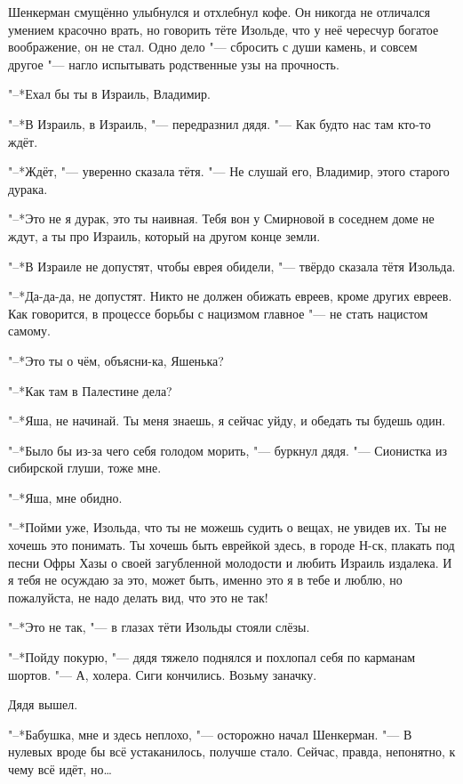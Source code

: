 Шенкерман смущённо улыбнулся и отхлебнул кофе.
Он никогда не отличался умением красочно врать, но говорить тёте Изольде, что у неё чересчур богатое воображение, он не стал.
Одно дело "--- сбросить с души камень, и совсем другое "--- нагло испытывать родственные узы на прочность.

\textspace

"--*Ехал бы ты в Израиль, Владимир.

"--*В Израиль, в Израиль, "--- передразнил дядя.
"--- Как будто нас там кто-то ждёт.

"--*Ждёт, "--- уверенно сказала тётя.
"--- Не слушай его, Владимир, этого старого дурака.

"--*Это не я дурак, это ты наивная.
Тебя вон у Смирновой в соседнем доме не ждут, а ты про Израиль, который на другом конце земли.

"--*В Израиле не допустят, чтобы еврея обидели, "--- твёрдо сказала тётя Изольда.

"--*Да-да-да, не допустят.
Никто не должен обижать евреев, кроме других евреев.
Как говорится, в процессе борьбы с нацизмом главное "--- не стать нацистом самому.

"--*Это ты о чём, объясни-ка, Яшенька?

"--*Как там в Палестине дела?

"--*Яша, не начинай.
Ты меня знаешь, я сейчас уйду, и обедать ты будешь один.

"--*Было бы из-за чего себя голодом морить, "--- буркнул дядя.
"--- Сионистка из сибирской глуши, тоже мне.

"--*Яша, мне обидно.

"--*Пойми уже, Изольда, что ты не можешь судить о вещах, не увидев их.
Ты не хочешь это понимать.
Ты хочешь быть еврейкой здесь, в городе Н-ск, плакать под песни Офры Хазы о своей загубленной молодости и любить Израиль издалека.
И я тебя не осуждаю за это, может быть, именно это я в тебе и люблю, но пожалуйста, не надо делать вид, что это не так!

"--*Это не так, "--- в глазах тёти Изольды стояли слёзы.

"--*Пойду покурю, "--- дядя тяжело поднялся и похлопал себя по карманам шортов.
"--- А, холера.
Сиги кончились.
Возьму заначку.

Дядя вышел.

"--*Бабушка, мне и здесь неплохо, "--- осторожно начал Шенкерман.
"--- В нулевых вроде бы всё устаканилось, получше стало.
Сейчас, правда, непонятно, к чему всё идёт, но\ldots{}

